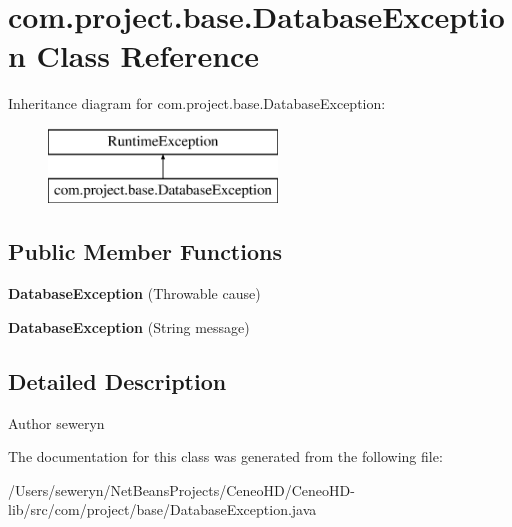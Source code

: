 \section{com.\+project.\+base.\+Database\+Exception Class Reference}
\label{classcom_1_1project_1_1base_1_1_database_exception}
Inheritance diagram for com.\+project.\+base.\+Database\+Exception\+:\begin{figure}[H]
\begin{center}
\leavevmode
\includegraphics[height=2.000000cm]{classcom_1_1project_1_1base_1_1_database_exception}
\end{center}
\end{figure}
\subsection*{Public Member Functions}
\begin{DoxyCompactItemize}
\item 
\mbox{\label{classcom_1_1project_1_1base_1_1_database_exception_a494e710fd8f0d181db37c3b9ad0f9410}} 
{\bfseries Database\+Exception} (Throwable cause)
\item 
\mbox{\label{classcom_1_1project_1_1base_1_1_database_exception_ac8fc4777486a87669b958b92a836bd14}} 
{\bfseries Database\+Exception} (String message)
\end{DoxyCompactItemize}


\subsection{Detailed Description}
\begin{DoxyAuthor}{Author}
seweryn 
\end{DoxyAuthor}


The documentation for this class was generated from the following file\+:\begin{DoxyCompactItemize}
\item 
/\+Users/seweryn/\+Net\+Beans\+Projects/\+Ceneo\+H\+D/\+Ceneo\+H\+D-\/lib/src/com/project/base/Database\+Exception.\+java\end{DoxyCompactItemize}
